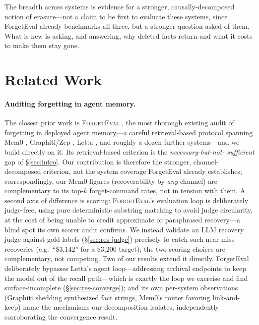 \documentclass[10pt,twocolumn,letterpaper]{article}
\theoremstyle{definition}
\theoremstyle{plain}
\newcommand{\sys}[1]{\textsc{#1}}
\begin{document}
The breadth across systems is evidence for a stronger, causally-decomposed notion
of erasure---not a claim to be first to evaluate these systems, since ForgetEval
\citep{forgeteval} already benchmarks all three, but a stronger question asked of
them. What is new is asking, and answering, why deleted facts return and what it
costs to make them stay gone.

\section{Related Work}\label{sec:related}

\paragraph{Auditing forgetting in agent memory.}
The closest prior work is \sys{ForgetEval} \citep{forgeteval}, the most thorough
existing audit of forgetting in deployed agent memory---a careful retrieval-based
protocol spanning Mem0 \citep{mem0}, Graphiti/Zep \citep{rasmussen2025zep},
Letta \citep{packer2024memgpt}, and roughly a dozen further systems---and we build
directly on it. Its retrieval-based criterion is the \emph{necessary-but-not-
sufficient} gap of \S\ref{sec:intro}. Our contribution is therefore the stronger,
channel-decomposed criterion, not the system coverage ForgetEval already
establishes; correspondingly, our Mem0 figures (recoverability by \emph{any}
channel) are complementary to its top-$k$ forget-command rates, not in tension
with them. A second axis of difference is scoring: \sys{ForgetEval}'s evaluation loop is
deliberately judge-free, using pure deterministic substring matching to avoid
judge circularity, at the cost of being unable to credit approximate or
paraphrased recovery---a blind spot its own scorer audit confirms. We instead
validate an LLM recovery judge against gold labels (\S\ref{sec:res-judge})
precisely to catch such near-miss recoveries (e.g.\ ``\$3,142'' for a \$3,200
target); the two scoring choices are complementary, not competing. Two of our results extend it directly. ForgetEval deliberately bypasses
Letta's agent loop---addressing archival endpoints to keep the model out of the
recall path---which is exactly the loop we exercise and find surface-incomplete
(\S\ref{sec:res-converge}); and its own per-system observations (Graphiti shedding
synthesized fact strings, Mem0's router favoring link-and-keep) name the
mechanisms our decomposition isolates, independently corroborating the convergence
result.
\end{document}
